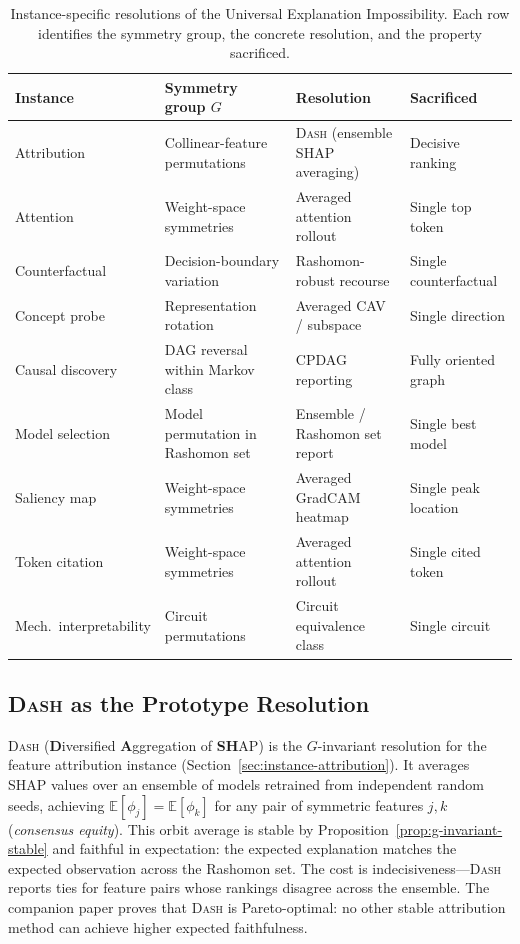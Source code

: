 \documentclass{article}
\newcommand{\E}{\mathbb{E}}
\newcommand{\DASH}{\textsc{Dash}}
\begin{document}
\begin{table}[t]
\centering
\caption{Instance-specific resolutions of the Universal Explanation
  Impossibility.  Each row identifies the symmetry group, the concrete
  resolution, and the property sacrificed.}
\label{tab:resolutions}
\small
\begin{tabular}{@{}llll@{}}
\toprule
Instance & Symmetry group $G$ & Resolution & Sacrificed \\
\midrule
Attribution &
  Collinear-feature permutations &
  \DASH{} (ensemble SHAP averaging) &
  Decisive ranking \\
Attention &
  Weight-space symmetries &
  Averaged attention rollout &
  Single top token \\
Counterfactual &
  Decision-boundary variation &
  Rashomon-robust recourse &
  Single counterfactual \\
Concept probe &
  Representation rotation &
  Averaged CAV / subspace &
  Single direction \\
Causal discovery &
  DAG reversal within Markov class &
  CPDAG reporting &
  Fully oriented graph \\
Model selection &
  Model permutation in Rashomon set &
  Ensemble / Rashomon set report &
  Single best model \\
Saliency map &
  Weight-space symmetries &
  Averaged GradCAM heatmap &
  Single peak location \\
Token citation &
  Weight-space symmetries &
  Averaged attention rollout &
  Single cited token \\
Mech.\ interpretability &
  Circuit permutations &
  Circuit equivalence class &
  Single circuit \\
\bottomrule
\end{tabular}
\end{table}

\subsection{\DASH{} as the Prototype Resolution}
\label{sec:dash-prototype}

\DASH{} (\textbf{D}iversified \textbf{A}ggregation of \textbf{SH}AP)
is the $G$-invariant resolution for the feature attribution instance
(Section~\ref{sec:instance-attribution}).  It averages SHAP values over an
ensemble of models retrained from independent random seeds, achieving
$\E[\phi_j] = \E[\phi_k]$ for any pair of symmetric features $j, k$
(\emph{consensus equity}).  This orbit average is stable by
Proposition~\ref{prop:g-invariant-stable} and faithful in expectation: the
expected explanation matches the expected observation across the Rashomon set.
The cost is indecisiveness---\DASH{} reports ties for feature pairs whose
rankings disagree across the ensemble.  The companion paper proves that
\DASH{} is Pareto-optimal: no other stable attribution method can achieve
higher expected faithfulness.
\end{document}
